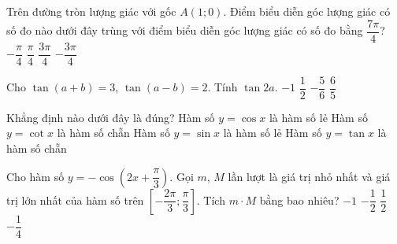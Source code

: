 \begin{name}
	{\tenchude}
	{\tendethi}
	{\tentruong}
	{\thoigian}
\end{name}
\setcounter{ex}{0}\setcounter{bt}{0}
\TN
\begin{ex}%
Trên đường tròn lượng giác với gốc $A(1;0)$. Điểm biểu diễn góc lượng giác có số đo nào dưới đây trùng với điểm biểu diễn góc lượng giác có số đo bằng $\dfrac{7\pi }{4}$?
\choice
{\True $-\dfrac{\pi }{4}$}
{$\dfrac{\pi }{4}$}
{$\dfrac{3\pi }{4}$}
{$-\dfrac{3\pi }{4}$}
\end{ex}

\begin{ex}%
Cho $\tan (a+b)=3$, $\tan (a-b)=2$. Tính $\tan 2a$.
\choice
{\True $-1$}
{$\dfrac{1}{2}$}
{$-\dfrac{5}{6}$}
{$\dfrac{6}{5}$}
\end{ex}

\begin{ex}%
Khẳng định nào dưới đây là đúng?
\choice
{Hàm số $y=\cos x$ là hàm số lẻ}
{Hàm số $y=\cot x$ là hàm số chẵn}
{\True Hàm số $y=\sin x$ là hàm số lẻ}
{Hàm số $y=\tan x$ là hàm số chẵn}
\end{ex}

\begin{ex}%
Cho hàm số $y=-\cos\left(2x+\dfrac{\pi}{3}\right)$. Gọi $m$, $M$ lần lượt là giá trị nhỏ nhất và giá trị lớn nhất của hàm số trên $\left[-\dfrac{2\pi}{3}; \dfrac{\pi}{3}\right]$. Tích $m\cdot M$ bằng bao nhiêu?
\choice
{\True $-1$}
{$-\dfrac{1}{2}$}
{$\dfrac{1}{2}$}
{$-\dfrac{1}{4}$}
\end{ex}

